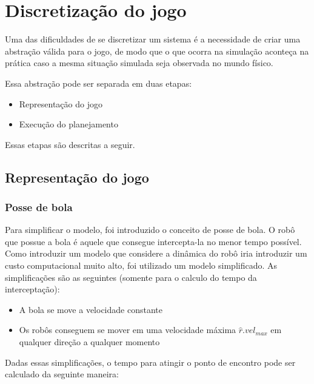 \section{Discretização do jogo}\label{sec:mapeamento}

Uma das dificuldades de se discretizar um sistema é a necessidade de criar uma
abstração válida para o jogo, de modo que o que ocorra na simulação aconteça na
prática caso a mesma situação simulada seja observada no mundo físico.

Essa abstração pode ser separada em duas etapas:

\begin{itemize}
  \item Representação do jogo
  \item Execução do planejamento
\end{itemize}

Essas etapas são descritas a seguir.

\subsection{Representação do jogo}\label{subsec:repres_jogo}

\subsubsection{Posse de bola}

Para simplificar o modelo, foi introduzido o conceito de posse
de bola. O robô que possue a bola é aquele que consegue intercepta-la
no menor tempo possível. Como introduzir um modelo que considere
a dinâmica do robô iria introduzir um custo computacional muito alto,
foi utilizado um modelo simplificado. As simplificações são as
seguintes (somente para o calculo do tempo da interceptação):

\begin{itemize}
  \item A bola se move a velocidade constante
  \item Os robôs conseguem se mover em uma velocidade máxima
        $\hat{r}.vel_{max}$ em qualquer direção a qualquer momento
\end{itemize}

Dadas essas simplificações, o tempo para atingir o ponto de
encontro pode ser calculado da seguinte maneira: 

